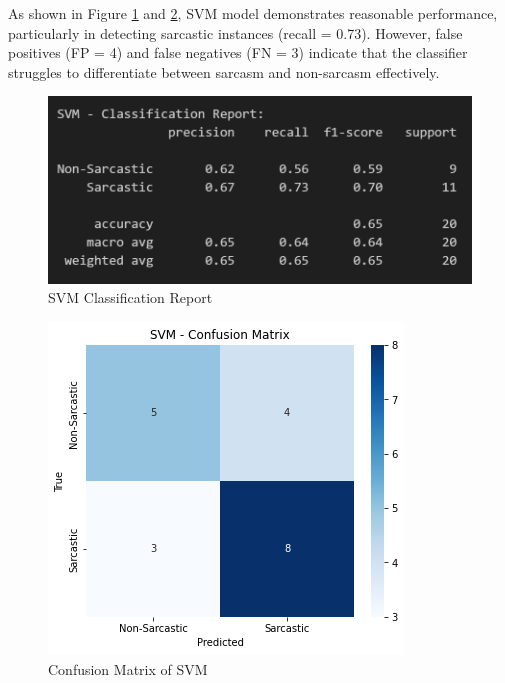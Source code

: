 \documentclass[11pt]{article}
\begin{document}
As shown in Figure \ref{fig:svmcr} and \ref{fig:svmcm}, SVM model demonstrates reasonable performance, particularly in detecting sarcastic instances (recall = 0.73). However, false positives (FP = 4) and false negatives (FN = 3) indicate that the classifier struggles to differentiate between sarcasm and non-sarcasm effectively.
\begin{figure}[htbp]
    \centering
    \includegraphics[width=.8\linewidth]{pic/SVM-Report.png}
    \caption{SVM Classification Report}
    \label{fig:svmcr}
\end{figure}
\begin{figure}[htbp]
    \centering
    \includegraphics[width=.8\linewidth]{pic/SVM-Confusion-Matrix.png}
    \caption{Confusion Matrix of SVM}
    \label{fig:svmcm}
\end{figure}
\end{document}
